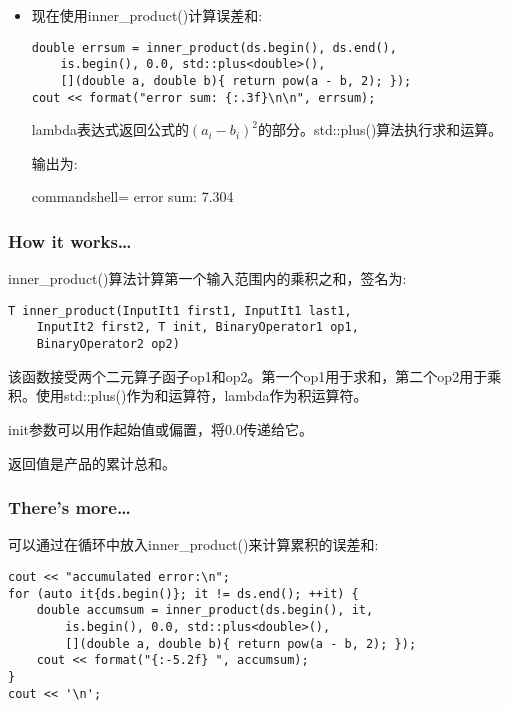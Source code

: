 \begin{itemize}
\item 
现在使用inner\_product()计算误差和:

\begin{lstlisting}[style=styleCXX]
double errsum = inner_product(ds.begin(), ds.end(),
	is.begin(), 0.0, std::plus<double>(),
	[](double a, double b){ return pow(a - b, 2); });
cout << format("error sum: {:.3f}\n\n", errsum);
\end{lstlisting}

lambda表达式返回公式的$ (a_i - b_i)^2 $的部分。std::plus()算法执行求和运算。

输出为:

\begin{tcblisting}{commandshell={}}
error sum: 7.304
\end{tcblisting}
\end{itemize}

\subsubsection{How it works…}

inner\_product()算法计算第一个输入范围内的乘积之和，签名为:

\begin{lstlisting}[style=styleCXX]
T inner_product(InputIt1 first1, InputIt1 last1,
	InputIt2 first2, T init, BinaryOperator1 op1,
	BinaryOperator2 op2)
\end{lstlisting}

该函数接受两个二元算子函子op1和op2。第一个op1用于求和，第二个op2用于乘积。使用std::plus()作为和运算符，lambda作为积运算符。

init参数可以用作起始值或偏置，将0.0传递给它。

返回值是产品的累计总和。

\subsubsection{There's more…}

可以通过在循环中放入inner\_product()来计算累积的误差和:

\begin{lstlisting}[style=styleCXX]
cout << "accumulated error:\n";
for (auto it{ds.begin()}; it != ds.end(); ++it) {
	double accumsum = inner_product(ds.begin(), it,
		is.begin(), 0.0, std::plus<double>(),
		[](double a, double b){ return pow(a - b, 2); });
	cout << format("{:-5.2f} ", accumsum);
}
cout << '\n';
\end{lstlisting}

